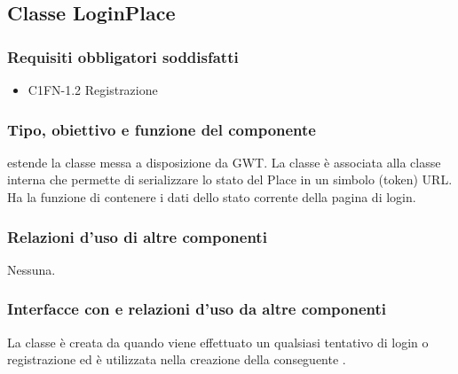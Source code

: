 \subsection{Classe LoginPlace}
\subsubsection*{Requisiti obbligatori soddisfatti}
\begin{itemize}
	\item C1FN-1.2 Registrazione
\end{itemize}
\subsubsection*{Tipo, obiettivo e funzione del componente}
 estende la classe  messa a disposizione da GWT. La
classe \`e associata alla classe interna  che permette di
serializzare lo stato del Place in un simbolo (token) URL.
Ha la funzione di contenere i dati dello stato corrente della pagina di login.
\subsubsection*{Relazioni d'uso di altre componenti}
Nessuna.
\subsubsection*{Interfacce con e relazioni d'uso da altre componenti}
La classe \`e creata da  quando viene effettuato un qualsiasi
tentativo di login o registrazione ed \`e utilizzata nella creazione della
conseguente . 
